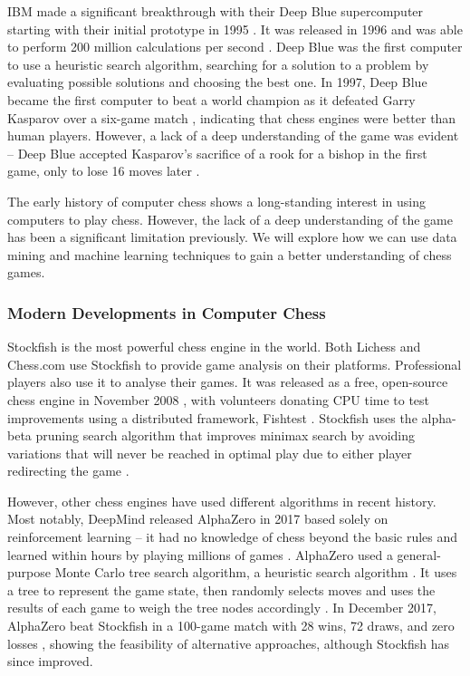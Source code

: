 \documentclass[a4paper, 11pt]{article}
\begin{document}
IBM made a significant breakthrough with their Deep Blue supercomputer starting with their initial prototype in 1995 \cite{hsu1995deep}. It was released in 1996 \cite{hsu1999ibm} and was able to perform 200 million calculations per second \cite{strogatz2018one}. Deep Blue was the first computer to use a heuristic search algorithm, searching for a solution to a problem by evaluating possible solutions and choosing the best one. In 1997, Deep Blue became the first computer to beat a world champion as it defeated Garry Kasparov over a six-game match \cite{seirawan1997implications}, indicating that chess engines were better than human players. However, a lack of a deep understanding of the game was evident -- Deep Blue accepted Kasparov's sacrifice of a rook for a bishop in the first game, only to lose 16 moves later \cite{strogatz2018one}.

The early history of computer chess shows a long-standing interest in using computers to play chess. However, the lack of a deep understanding of the game has been a significant limitation previously. We will explore how we can use data mining and machine learning techniques to gain a better understanding of chess games.

\subsubsection{Modern Developments in Computer Chess}
Stockfish is the most powerful chess engine in the world. Both Lichess and Chess.com use Stockfish to provide game analysis on their platforms. Professional players also use it to analyse their games. It was released as a free, open-source chess engine in November 2008 \cite{aboutStockfish}, with volunteers donating CPU time to test improvements using a distributed framework, Fishtest \cite{fishtestDistributedTestingFramework}. Stockfish uses the alpha-beta pruning search algorithm that improves minimax search \cite{v1928theorie} by avoiding variations that will never be reached in optimal play due to either player redirecting the game \cite{maharaj2022chess}.

However, other chess engines have used different algorithms in recent history. Most notably, DeepMind released AlphaZero in 2017 \cite{silver2017mastering2} based solely on reinforcement learning -- it had no knowledge of chess beyond the basic rules and learned within hours by playing millions of games \cite{strogatz2018one}. AlphaZero used a general-purpose Monte Carlo tree search algorithm, a heuristic search algorithm \cite{silver2017mastering2}. It uses a tree to represent the game state, then randomly selects moves and uses the results of each game to weigh the tree nodes accordingly \cite{chaslot2008monte}. In December 2017, AlphaZero beat Stockfish in a 100-game match with 28 wins, 72 draws, and zero losses \cite{klein2017google}, showing the feasibility of alternative approaches, although Stockfish has since improved.
\end{document}
